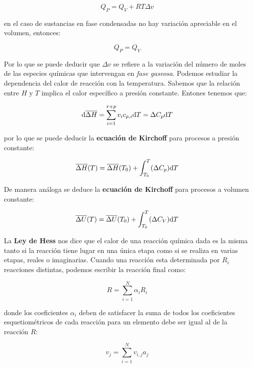\documentclass[12pt]{book}
\begin{document}
\begin{equation}
Q_P = Q_V + RT \Delta v
\end{equation}

en el caso de sustancias en fase condensadas no hay variación apreciable en el volumen, entonces:

\begin{equation}
Q_P = Q_V
\end{equation}

Por lo que se puede deducir que $\Delta v$ se refiere a la variación del número de moles de las especies químicas que intervengan en \textit{fase gaseosa}. Podemos estudiar la dependencia del calor de reacción con la temperatura. Sabemos que la relación entre $H$ y $T$ implica el calor específico a presión constante. Entones tenemos que:

\begin{equation}
\mathrm{d} \overline{\Delta H} = \sum_{i=1}^{r+p} v_ i c_{p,i} \mathrm{d} T = \Delta C_p \mathrm{d} T
\end{equation}

por lo que se puede deducir la \textbf{ecuación de Kirchoff} para procesos a presión constante:

\begin{equation}
\overline{\Delta H} (T) = \overline{\Delta H} (T_0) + \int_{T_0}^T (\Delta C_p) \mathrm{d} T
\end{equation}

De manera análoga se deduce la \textbf{ecuación de Kirchoff} para procesos a volumen constante:

\begin{equation}
\overline{\Delta U} (T) = \overline{\Delta U} (T_0) + \int_{T_0}^T (\Delta C_V) \mathrm{d} T
\end{equation}

La \textbf{Ley de Hess} nos dice que el calor de una reacción química dada es la misma tanto si la reacción tiene lugar en una única etapa como si se realiza en varias etapas, reales o imaginarias.  Cuando una reacción esta determinada por $R_i$ reacciones distintas, podemos escribir la reacción final como:

\begin{equation}
R = \sum_{i=1}^N \alpha_i R_i
\end{equation}

donde los coeficientes $\alpha_i$ deben de satisfacer la suma de todos los coeficientes esquetiométricos de cada reacción para un elemento debe ser igual al de la reacción $R$:

\begin{equation}
v_j = \sum_{i=1}^N v_{i,j} a_j
\end{equation}
\end{document}
